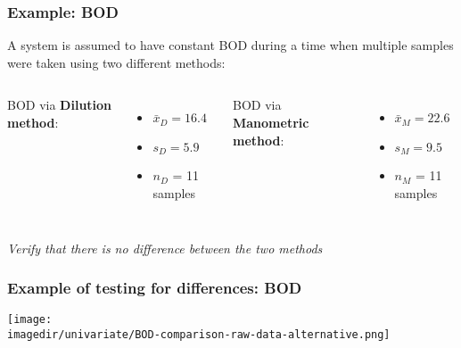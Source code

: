 \begin{frame}\frametitle{Example: BOD}
	A system is assumed to have constant BOD during a time when multiple samples were taken using two different methods:
	\begin{center}
	\end{center}
	\begin{columns}[t]
			BOD via \textbf{Dilution method}:
			\begin{itemize}
				\item	$\bar{x}_D = 16.4$
				\item	$s_D = 5.9$
				\item	$n_D$ = 11 samples
			\end{itemize}
			BOD via \textbf{Manometric method}:
			\begin{itemize}
				\item	$\bar{x}_M = 22.6$
				\item	$s_M = 9.5$
				\item	$n_M$ = 11 samples
			\end{itemize}
	\end{columns}
	\vspace{6pt}
	\emph{Verify that there is no difference between the two methods}
\end{frame}

\begin{frame}\frametitle{Example of testing for differences: BOD}
	\vspace{12pt}

	\hspace{-0.75cm}\texttt{[image: \\imagedir/univariate/BOD-comparison-raw-data-alternative.png]}
\end{frame}

